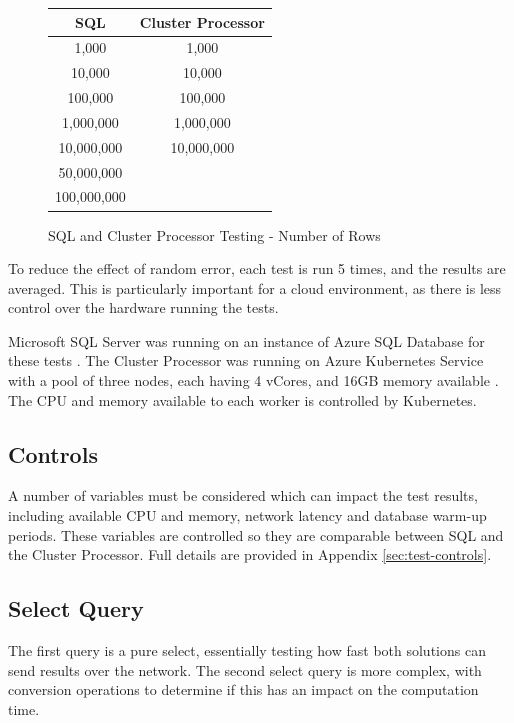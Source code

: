 \begin{figure}[ht]
	\centering
	\begin{tabular}{| c | c |}
		\hline
		\textbf{SQL} & \textbf{Cluster Processor} \\ \hline
		1,000 & 1,000 \\ \hline
		10,000 & 10,000 \\ \hline
		100,000 & 100,000 \\ \hline
		1,000,000 & 1,000,000 \\ \hline
		10,000,000 & 10,000,000 \\ \hline
		50,000,000 & \\ \hline
		100,000,000 & \\ \hline
	\end{tabular}
	\caption{SQL and Cluster Processor Testing - Number of Rows}
	\label{fig:sql-cluster-data-volumes}
\end{figure}

To reduce the effect of random error, each test is run 5 times, and the results are averaged. This is particularly important for a cloud environment, as there is less control over the hardware running the tests.

Microsoft SQL Server was running on an instance of Azure SQL Database for these tests \cite{azuresqldatabase}. The Cluster Processor was running on Azure Kubernetes Service with a pool of three nodes, each having 4 vCores, and 16GB memory available \cite{azurekubernetesservice}. The CPU and memory available to each worker is controlled by Kubernetes.

\subsection{Controls}
A number of variables must be considered which can impact the test results, including available CPU and memory, network latency and database warm-up periods. These variables are controlled so they are comparable between SQL and the Cluster Processor. Full details are provided in Appendix \ref{sec:test-controls}.

\subsection{Select Query}
The first query is a pure select, essentially testing how fast both solutions can send results over the network. 
The second select query is more complex, with conversion operations to determine if this has an impact on the computation time. 

